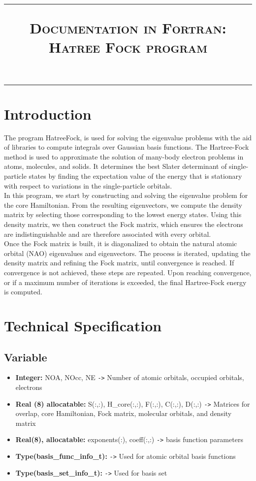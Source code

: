\documentclass[11pt,a4paper]{article}
\title{\vspace{-3.5cm}\noindent\rule{\textwidth}{1pt}\vspace{3mm} \textsc{Documentation in Fortran: \\ \vspace{0.5cm} \Huge Hatree Fock program}}
\date{}
\begin{document}
\maketitle
\thispagestyle{empty}
\vspace{-1.5cm}
\noindent\rule{\textwidth}{1pt}
\section*{Introduction}
The program HatreeFock, is used for solving the eigenvalue problems with the aid of libraries to compute integrals over Gaussian basis functions. The Hartree-Fock method is used to approximate the solution of many-body electron problems in atoms, molecules, and solids. It determines the best Slater determinant of single-particle states by finding the expectation value of the energy that is stationary with respect to variations in the single-particle orbitals. \\
\hspace*{2em}  In this program, we start by constructing and solving the eigenvalue problem for the core Hamiltonian. From the resulting eigenvectors, we compute the density matrix by selecting those corresponding to the lowest energy states. Using this density matrix, we then construct the Fock matrix, which ensures the electrons are indistinguishable and are therefore associated with every orbital. \\
\hspace*{2em}  Once the Fock matrix is built, it is diagonalized to obtain the natural atomic orbital (NAO) eigenvalues and eigenvectors. The process is iterated, updating the density matrix and refining the Fock matrix, until convergence is reached. If convergence is not achieved, these steps are repeated. Upon reaching convergence, or if a maximum number of iterations is exceeded, the final Hartree-Fock energy is computed.


\section*{Technical Specification}

\subsection*{Variable}
\begin{itemize}
    \item \textbf{Integer:} NOA, NOcc, NE \texttt{->} Number of atomic orbitals, occupied orbitals, electrons
    \item \textbf{Real (8) allocatable:} S(:,:), H\_core(:,:), F(:,:), C(:,:), D(:,:) \texttt{->} Matrices for overlap, core Hamiltonian, Fock matrix, molecular orbitals, and density matrix
    \item \textbf{Real(8), allocatable:} exponents(:), coeff(:,:) \texttt{->} basis function parameters
    \item \textbf{Type(basis\_func\_info\_t):} \texttt{->} Used for atomic orbital basis functions
    \item \textbf{Type(basis\_set\_info\_t):} \texttt{->} Used for basis set
\end{itemize}
\end{document}
